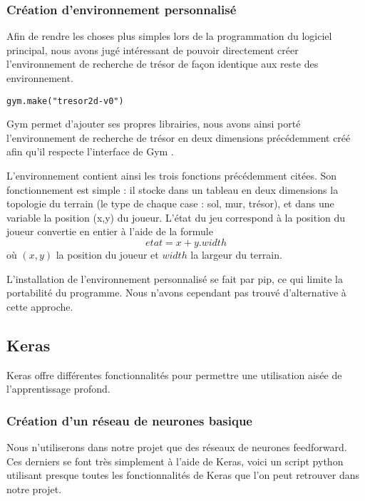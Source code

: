 \subsubsection{Création d'environnement personnalisé}
Afin de rendre les choses plus simples lors de la programmation du logiciel principal, nous avons jugé intéressant de pouvoir directement créer l'environnement de recherche de trésor de façon identique aux reste des environnement.
\begin{verbatim}
gym.make("tresor2d-v0")
\end{verbatim}
Gym permet d'ajouter ses propres librairies, nous avons ainsi porté l'environnement de recherche de trésor en deux dimensions précédemment créé afin qu'il respecte l'interface de Gym \cite{gym_custom_env}.
\par
L'environnement contient ainsi les trois fonctions précédemment citées. Son fonctionnement est simple : il stocke dans un tableau en deux dimensions la topologie du terrain (le type de chaque case : sol, mur, trésor), et dans une variable la position (x,y) du joueur. L'état du jeu correspond à la position du joueur convertie en entier à l'aide de la formule
\[etat=x + y . width\]
où $(x,y)$ la position du joueur et $width$ la largeur du terrain.
\par
L'installation de l'environnement personnalisé se fait par pip, ce qui limite la portabilité du programme. Nous n'avons cependant pas trouvé d'alternative à cette approche.


\subsection{Keras}
Keras offre différentes fonctionnalités pour permettre une utilisation aisée de l'apprentissage profond.

\subsubsection{Création d'un réseau de neurones basique}
Nous n'utiliserons dans notre projet que des réseaux de neurones feedforward. Ces derniers se font très simplement à l'aide de Keras, voici un script python utilisant presque toutes les fonctionnalités de Keras que l'on peut retrouver dans notre projet.

